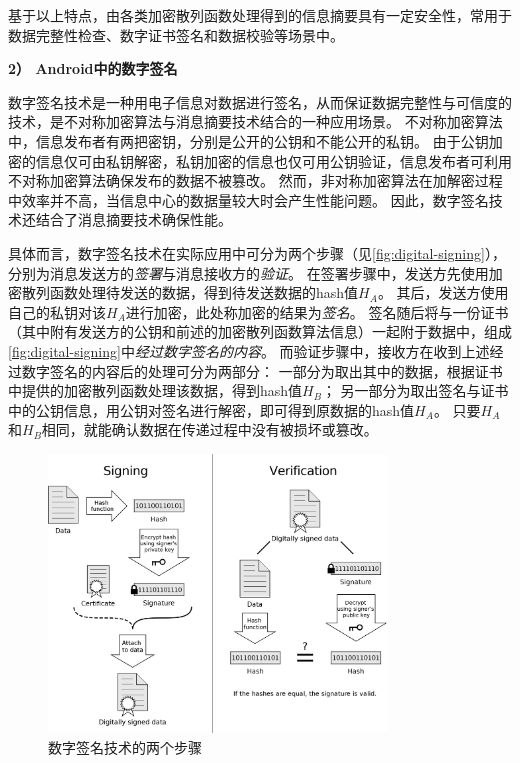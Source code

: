 基于以上特点，由各类加密散列函数处理得到的信息摘要具有一定安全性，常用于数据完整性检查、数字证书签名和数据校验等场景中。

\textbf{2） Android中的数字签名}

数字签名技术是一种用电子信息对数据进行签名，从而保证数据完整性与可信度的技术，是不对称加密算法与消息摘要技术结合的一种应用场景。
不对称加密算法中，信息发布者有两把密钥，分别是公开的公钥和不能公开的私钥。
由于公钥加密的信息仅可由私钥解密，私钥加密的信息也仅可用公钥验证，信息发布者可利用不对称加密算法确保发布的数据不被篡改。
然而，非对称加密算法在加解密过程中效率并不高，当信息中心的数据量较大时会产生性能问题。
因此，数字签名技术还结合了消息摘要技术确保性能。

具体而言，数字签名技术在实际应用中可分为两个步骤（见\autoref{fig:digital-signing}），分别为消息发送方的\textit{签署}与消息接收方的\textit{验证}。
在签署步骤中，发送方先使用加密散列函数处理待发送的数据，得到待发送数据的hash值$H_A$。
其后，发送方使用自己的私钥对该$H_A$进行加密，此处称加密的结果为\textit{签名}。
签名随后将与一份证书（其中附有发送方的公钥和前述的加密散列函数算法信息）一起附于数据中，组成\autoref{fig:digital-signing}中\textit{经过数字签名的内容}。
而验证步骤中，接收方在收到上述经过数字签名的内容后的处理可分为两部分：
一部分为取出其中的数据，根据证书中提供的加密散列函数处理该数据，得到hash值$H_B$；
另一部分为取出签名与证书中的公钥信息，用公钥对签名进行解密，即可得到原数据的hash值$H_A$。
只要$H_A$和$H_B$相同，就能确认数据在传递过程中没有被损坏或篡改。

\begin{figure}[htbp]
	\centering
	\includegraphics[width=0.8\textwidth]{./Figures/edwin-digital-signature-diagram.jpg}
	\caption{数字签名技术的两个步骤}
	\label{fig:digital-signing}
\end{figure}

